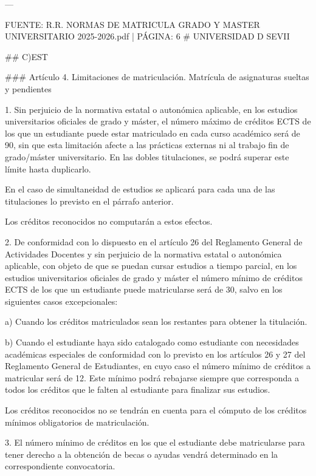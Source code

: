 \documentclass{article}
\begin{document}
\begin{itemize}
\begin{itemize}
\begin{scriptsize}
                  ---

                  FUENTE: R.R. NORMAS DE MATRICULA GRADO Y MASTER UNIVERSITARIO 2025-2026.pdf | PÁGINA: 6
                  \# UNIVERSIDAD D SEVII

                  \#\# C)EST

                  \#\#\# Artículo 4. Limitaciones de matriculación. Matrícula de asignaturas sueltas y pendientes

                  1. Sin perjuicio de la normativa estatal o autonómica aplicable, en los estudios universitarios oficiales de grado y máster, el número máximo de créditos ECTS de los que un estudiante puede estar matriculado en cada curso académico será de 90, sin que esta limitación afecte a las prácticas externas ni al trabajo fin de grado/máster universitario. En las dobles titulaciones, se podrá superar este límite hasta duplicarlo.

                  En el caso de simultaneidad de estudios se aplicará para cada una de las titulaciones lo previsto en el párrafo anterior.

                  Los créditos reconocidos no computarán a estos efectos.

                  2. De conformidad con lo dispuesto en el artículo 26 del Reglamento General de Actividades Docentes y sin perjuicio de la normativa estatal o autonómica aplicable, con objeto de que se puedan cursar estudios a tiempo parcial, en los estudios universitarios oficiales de grado y máster el número mínimo de créditos ECTS de los que un estudiante puede matricularse será de 30, salvo en los siguientes casos excepcionales:

                  a) Cuando los créditos matriculados sean los restantes para obtener la titulación.

                  b) Cuando el estudiante haya sido catalogado como estudiante con necesidades académicas especiales de conformidad con lo previsto en los artículos 26 y 27 del Reglamento General de Estudiantes, en cuyo caso el número mínimo de créditos a matricular será de 12. Este mínimo podrá rebajarse siempre que corresponda a todos los créditos que le falten al estudiante para finalizar sus estudios.

                  Los créditos reconocidos no se tendrán en cuenta para el cómputo de los créditos mínimos obligatorios de matriculación.

                  3. El número mínimo de créditos en los que el estudiante debe matricularse para tener derecho a la obtención de becas o ayudas vendrá determinado en la correspondiente convocatoria.


\end{scriptsize}
\end{itemize}
\end{itemize}
\end{document}

